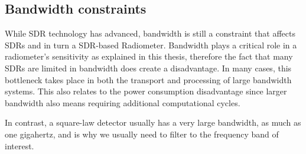 {\subsection{Bandwidth constraints}
While SDR technology has advanced, bandwidth is still a constraint that affects SDRs and in turn a SDR-based Radiometer.  Bandwidth plays a critical role in a radiometer's sensitivity as explained in this thesis, therefore the fact that many SDRs are limited in bandwidth does create a disadvantage.  In many cases, this bottleneck takes place in both the transport and processing of large bandwidth systems.  This also relates to the power consumption disadvantage since larger bandwidth also means requiring additional computational cycles.

In contrast, a square-law detector usually has a very large bandwidth, as much as one gigahertz, and is why we usually need to filter to the frequency band of interest.  








}
